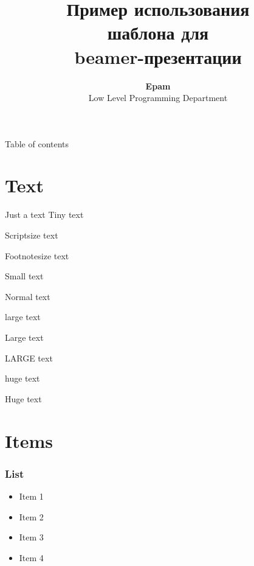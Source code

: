 
\title[bash]{Пример использования\\шаблона для\\beamer-презентации}

\author[Epam]{{\bf Epam}\\Low Level Programming Department}




\begin{frame}
	\titlepage
\end{frame}

\begin{frame}{Table of contents}
	\tableofcontents
\end{frame}


\section{Text}
\begin{frame}{Just a text}
    \tiny Tiny text

    \scriptsize Scriptsize text

    \footnotesize Footnotesize text

    \small Small text

    \normalsize Normal text

    \large large text

    \Large Large text

    \LARGE LARGE text

    \huge huge text

    \Huge Huge text

\end{frame}

\section{Items}
\begin{frame}
    \frametitle{List}

    \begin{itemize}
	\item Item 1
	\item Item 2
	\item Item 3
	\item Item 4
    \end{itemize}
\end{frame}

